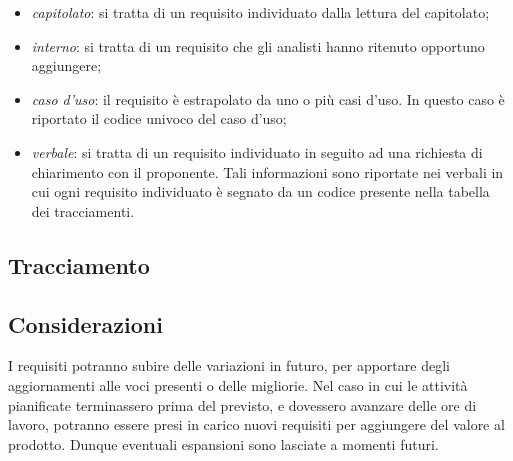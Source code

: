 \begin{itemize}
\begin{itemize}
		\item \textit{capitolato\glo}: si tratta di un requisito individuato dalla lettura del capitolato\glo;
		\item \textit{interno}: si tratta di un requisito che gli analisti hanno ritenuto opportuno aggiungere;
		\item \textit{caso d'uso}: il requisito è estrapolato da uno o più casi d'uso. In questo caso è riportato il codice univoco del caso d'uso;
		\item \textit{verbale}: si tratta di un requisito individuato in seguito ad una richiesta di chiarimento con il proponente. Tali informazioni sono riportate nei verbali in cui ogni requisito individuato è segnato da un codice presente nella tabella dei tracciamenti.
	\end{itemize}
\end{itemize}
\renewcommand{\arraystretch}{1.5}


\pagebreak




\pagebreak
\subsection{Tracciamento}  


\subsection{Considerazioni}
I requisiti potranno subire delle variazioni in futuro, per apportare degli aggiornamenti alle voci presenti o delle migliorie. Nel caso in cui le attività pianificate terminassero prima del previsto, e dovessero avanzare delle ore di lavoro, potranno essere presi in carico nuovi requisiti per aggiungere del valore al prodotto. Dunque eventuali espansioni sono lasciate a momenti futuri. 